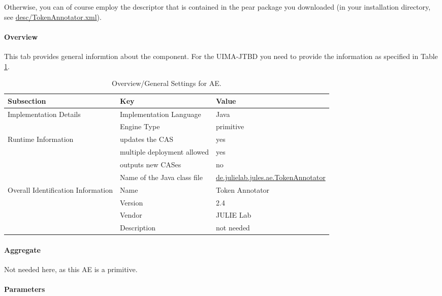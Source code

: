 \documentclass[11pt,a4paper,halfparskip]{scrartcl}
\begin{document}
Otherwise, you can of course employ the descriptor that is contained
in the pear package you downloaded (in your installation directory, see
\url{desc/TokenAnnotator.xml}).

\paragraph{Overview}
This tab provides general informtion about the component. For the
UIMA-JTBD you need to provide the information as specified in Table
\ref{tab:overview}.

\begin{table}[h!]
  \centering
  \begin{tabular}{|p{3.5cm}|p{4cm}|p{6cm}|}
    \hline
    Subsection & Key & Value \\
    \hline\hline
    Implementation Details & Implementation Language & Java \\
    \cline{2-3}
    & Engine Type & primitive \\
    \hline
    Runtime Information & updates the CAS & yes \\
    \cline{2-3}
    & multiple deployment allowed & yes \\
    \cline{2-3}
    & outputs new CASes &  no \\
    \cline{2-3}
    & Name of the Java class file & \url{de.julielab.jules.ae.TokenAnnotator}\\
    \hline
    Overall Identification Information & Name &  Token Annotator \\
    \cline{2-3}
    & Version &  2.4 \\
    \cline{2-3}
    & Vendor & JULIE Lab\\
    \cline{2-3}
    & Description & not needed\\
    \hline
  \end{tabular}
  \caption{Overview/General Settings for AE.}
  \label{tab:overview}
\end{table}


\paragraph{Aggregate}
Not needed here, as this AE is a primitive.

\paragraph{Parameters}
\label{sss:parameters}
\end{document}
